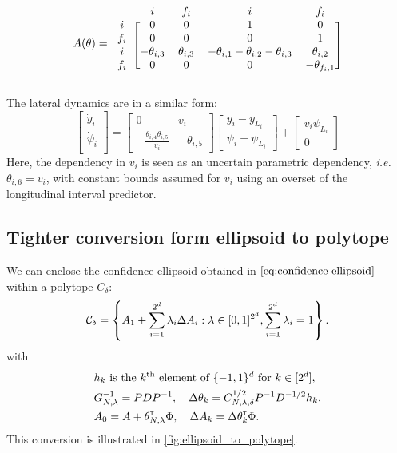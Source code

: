\documentclass{article}
\begin{document}
\begin{equation*}
A(\theta)
=
\begin{blockarray}{ccccc}
 & i & f_i & i & f_i \\
\begin{block}{c[cccc]}
i & 0 & 0 & 1 & 0 \\
f_i & 0 & 0 & 0 & 1 \\
i & -\theta_{i,3} & \theta_{i,3} & -\theta_{i,1}-\theta_{i,2}-\theta_{i,3} & \theta_{i,2} \\
f_i & 0 & 0 & 0 & -\theta_{f_i,1} \\
\end{block}
\end{blockarray}
\end{equation*}

The lateral dynamics are in a similar form:
\begin{equation*}
\begin{bmatrix}
\dot{y}_i \\
\dot{\psi}_i \\
\end{bmatrix}
=
\begin{bmatrix}
0 & v_i \\
-\frac{\theta_{i,4} \theta_{i,5}}{v_i} & -\theta_{i,5}
\end{bmatrix}
\begin{bmatrix}
y_i - y_{L_i} \\
\psi_i - \psi_{L_i}
\end{bmatrix}
+
\begin{bmatrix}
v_i\psi_{L_i} \\
0
\end{bmatrix}
\end{equation*}
Here, the dependency in $v_i$ is seen as an uncertain parametric dependency, \emph{i.e.} $\theta_{i,6}=v_i$, with constant bounds assumed for $v_i$ using an overset of the longitudinal interval predictor.

\subsection{Tighter conversion form ellipsoid to polytope}
\label{sec:tight-polytope}
\begin{lemma}
\label{lem:tight_polytope}
We can enclose the confidence ellipsoid obtained in $\eqref{eq:confidence-ellipsoid}$ within a polytope $C_\delta$:
\begin{equation}
     \mathcal{C}_\delta = \left\{ A_{1}+\sum_{i=1}^{2^d}\lambda_{i}\Delta A_{i}: \lambda\in[0, 1]^{2^d},  \sum_{i=1}^{2^d}\lambda_{i}=1\right\}.
\end{equation}
with 
\begin{align*}
    &h_k \text{ is the }k^\text{th}\text{ element of }\{-1,1\}^d\text{ for } k\in[2^d],\\
    &G_{N,\lambda}^{-1} = PDP^{-1}, \quad \Delta\theta_k = C_{N,\lambda,\delta}^{1/2} P^{-1}D^{-1/2} h_k, \\
    &A_0 = A + \theta_{N,\lambda}^{\mathsf{\scriptscriptstyle T}}\Phi, \quad \Delta A_k = \Delta\theta_k^{\mathsf{\scriptscriptstyle T}}\Phi.
\end{align*}
This conversion is illustrated in \autoref{fig:ellipsoid_to_polytope}.
\end{lemma}
\end{document}
